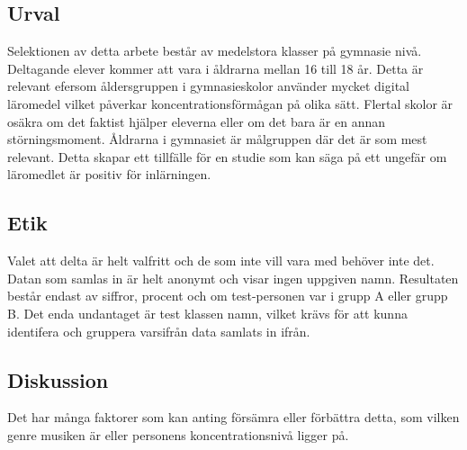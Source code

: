 \documentclass[11p]{article}
\begin{document}
    \subsection{Urval}
    Selektionen av detta arbete består av medelstora klasser på gymnasie nivå.
    Deltagande elever kommer att vara i åldrarna mellan 16 till 18 år.
    Detta är relevant efersom åldersgruppen i gymnasieskolor använder mycket digital läromedel vilket påverkar koncentrationsförmågan på olika sätt.
    Flertal skolor är osäkra om det faktist hjälper eleverna eller om det bara är en annan störningsmoment.
    Åldrarna i gymnasiet är målgruppen där det är som mest relevant.
    Detta skapar ett tillfälle för en studie som kan säga på ett ungefär om läromedlet är positiv för inlärningen.


    \subsection{Etik}
    Valet att delta är helt valfritt och de som inte vill vara med behöver inte det.
    Datan som samlas in är helt anonymt och visar ingen uppgiven namn.
    Resultaten består endast av siffror, procent och om test-personen var i grupp A eller grupp B.
    Det enda undantaget är test klassen namn, vilket krävs för att kunna identifera och gruppera varsifrån data samlats in ifrån.


    \subsection{Diskussion}
    Det har många faktorer som kan anting försämra eller förbättra detta, som vilken genre musiken är eller personens koncentrationsnivå ligger på.


    \printbibliography
\end{document}
